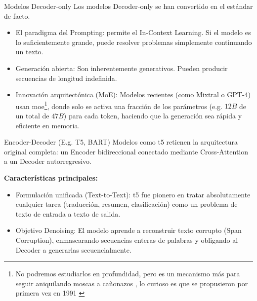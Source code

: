 \begin{frame}{Modelos Decoder-only}
Los modelos Decoder-only se han convertido en el \alert{estándar} de facto.

\begin{itemize}
    \item \alert{El paradigma del Prompting:} permite el \alert{In-Context Learning}. Si el modelo es lo suficientemente grande, puede resolver problemas simplemente continuando un texto.
    \item \alert{Generación abierta:} Son inherentemente generativos. Pueden producir secuencias de longitud indefinida.
    \item \alert{Innovación arquitectónica (MoE):} Modelos recientes (como Mixtral o GPT-4) usan \alert{\gls{moe}}\footnote{No podremos estudiarlos en profundidad, pero es un mecanismo más para seguir aniquilando moscas a cañonazos \cite{mu2025comprehensive}, lo curioso es que se propusieron por primera vez en 1991 \cite{jacobs1991adaptive}}, donde solo se activa una fracción de los parámetros (e.g. $12B$ de un total de $47B$) para cada token, haciendo que la generación sea rápida y eficiente en memoria.
\end{itemize}
\end{frame}

\begin{frame}{Encoder-Decoder (E.g. T5, BART)}
Modelos como \alert{\gls{t5}} \cite{raffel2020exploring} retienen la arquitectura original completa: un Encoder bidireccional conectado mediante \alert{Cross-Attention} a un Decoder autorregresivo.

\textbf{Características principales:}
\begin{itemize}
    \item \alert{Formulación unificada (Text-to-Text):} \gls{t5} fue pionero en tratar absolutamente cualquier tarea (traducción, resumen, clasificación) como un problema de texto de entrada a texto de salida.
    \item \alert{Objetivo Denoising:} El modelo aprende a reconstruir texto corrupto (Span Corruption), enmascarando secuencias enteras de palabras y obligando al Decoder a generarlas secuencialmente.
\end{itemize}
\end{frame}


